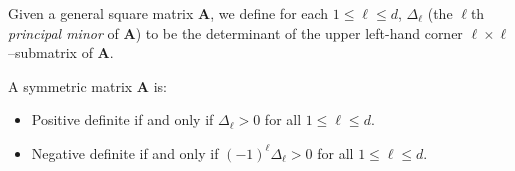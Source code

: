 \begin{theorem}\label{theorem:PrincipalMinors}
Given a general square matrix $\boldsymbol{A}$, we define for each $1\leq \ell \leq d$, $\Delta_\ell$ (the $\ell$th \emph{principal minor} of $\boldsymbol{A}$) to be the determinant of the upper left-hand corner $\ell \times \ell$--submatrix of $\boldsymbol{A}$.  
\begin{center}
\end{center}
A symmetric matrix $\boldsymbol{A}$ is:
\begin{itemize}
\item Positive definite if and only if $\Delta_\ell > 0$ for all $1\leq \ell \leq d$.
\item Negative definite if and only if $(-1)^\ell \Delta_\ell>0$ for all $1\leq \ell \leq d$.
\end{itemize}
\end{theorem}

